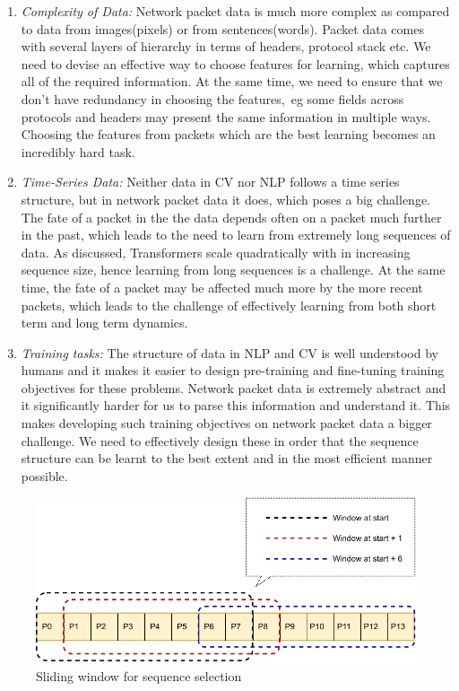 \begin{enumerate}
\item \emph{Complexity of Data:} Network packet data is much more complex as compared to data from images(pixels) or from sentences(words). Packet data comes with several layers of hierarchy in terms of headers, protocol stack etc. We need to devise an effective way to choose features for learning, which captures all of the required information. At the same time, we need to ensure that we don't have redundancy in choosing the features,\ eg some fields across protocols and headers may present the same information in multiple ways. Choosing the features from packets which are the best learning becomes an incredibly hard task.

\item \emph{Time-Series Data:} Neither data in CV nor NLP follows a time series structure, but in network packet data it does, which poses a big challenge. The fate of a packet in the the data depends often on a packet much further in the past, which leads to the need to learn from extremely long sequences of data. As discussed, Transformers scale quadratically with in increasing sequence size, hence learning from long sequences is a challenge. At the same time, the fate of a packet may be affected much more by the more recent packets, which leads to the challenge of effectively learning from both short term and long term dynamics.

\item \emph{Training tasks:} The structure of data in NLP and CV is well understood by humans and it makes it easier to design pre-training and fine-tuning training objectives for these problems. Network packet data is extremely abstract and it significantly harder for us to parse this information and understand it. This makes developing such training objectives on network packet data a bigger challenge. We need to effectively design these in order that the sequence structure can be learnt to the best extent and in the most efficient manner possible.

\end{enumerate}

\begin{figure}[h]
  \begin{center}
    \includegraphics[scale=1]{figures/slidingwindow.pdf}
    \caption{Sliding window for sequence selection}
    \label{fig:sliding}
  \end{center}
\end{figure}


